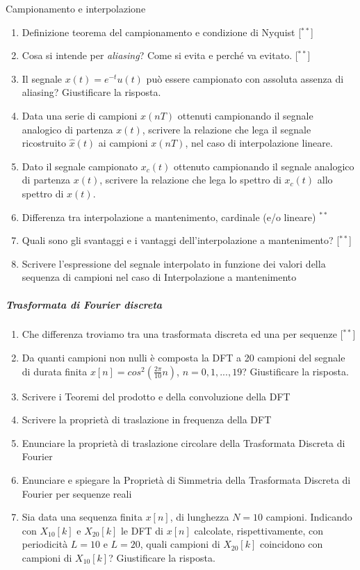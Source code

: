 \documentclass[
]{article}
\providecommand{\tightlist}{%
  \setlength{\itemsep}{0pt}\setlength{\parskip}{0pt}}
\begin{document}
Campionamento e interpolazione

\begin{enumerate}
\def\labelenumi{\arabic{enumi}.}
\setcounter{enumi}{14}
\tightlist
\item
  Definizione teorema del campionamento e condizione di Nyquist
  {[}\(^{**}\){]}
\item
  Cosa si intende per \emph{aliasing}? Come si evita e perché va
  evitato. {[}\(^{**}\){]}
\item
  Il segnale \(x(t) = e^{-t} u(t)\) può essere campionato con assoluta
  assenza di aliasing? Giustificare la risposta.
\item
  Data una serie di campioni \(x(nT)\) ottenuti campionando il segnale
  analogico di partenza \(x(t)\), scrivere la relazione che lega il
  segnale ricostruito \(\hat{x}(t)\) ai campioni \(x(nT)\), nel caso di
  interpolazione lineare.
\item
  Dato il segnale campionato \(x_c(t)\) ottenuto campionando il segnale
  analogico di partenza \(x(t)\), scrivere la relazione che lega lo
  spettro di \(x_c(t)\) allo spettro di \(x(t)\).
\item
  Differenza tra interpolazione a mantenimento, cardinale (e/o lineare)
  \(^{**}\)
\item
  Quali sono gli svantaggi e i vantaggi dell'interpolazione a
  mantenimento? {[}\(^{**}\){]}
\item
  Scrivere l'espressione del segnale interpolato in funzione dei valori
  della sequenza di campioni nel caso di Interpolazione a mantenimento
\end{enumerate}

\subparagraph{Trasformata di Fourier
discreta}\label{trasformata-di-fourier-discreta}

\begin{enumerate}
\def\labelenumi{\arabic{enumi}.}
\setcounter{enumi}{22}
\tightlist
\item
  Che differenza troviamo tra una trasformata discreta ed una per
  sequenze {[}\(^{**}\){]}
\item
  Da quanti campioni non nulli è composta la DFT a 20 campioni del
  segnale di durata finita \(x[n] = cos^2(\frac{2\pi}{10}n)\),
  \(n = 0, 1, . . . , 19\)? Giustificare la risposta.
\item
  Scrivere i Teoremi del prodotto e della convoluzione della DFT
\item
  Scrivere la proprietà di traslazione in frequenza della DFT
\item
  Enunciare la proprietà di traslazione circolare della Trasformata
  Discreta di Fourier
\item
  Enunciare e spiegare la Proprietà di Simmetria della Trasformata
  Discreta di Fourier per sequenze reali
\item
  Sia data una sequenza finita \(x[n]\), di lunghezza \(N = 10\)
  campioni. Indicando con \(X_{10}[k]\) e \(X_{20}[k]\) le DFT di
  \(x[n]\) calcolate, rispettivamente, con periodicità \(L = 10\) e
  \(L = 20\), quali campioni di \(X_{20}[k]\) coincidono con campioni di
  \(X_{10}[k]\)? Giustificare la risposta.
\end{enumerate}
\end{document}
